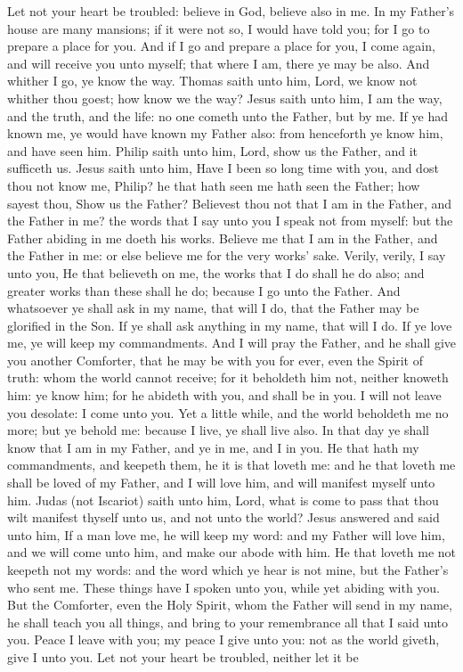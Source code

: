 Let not your heart be troubled: believe in God, believe also in me. In my Father’s house are many mansions; if it were not so, I would have told you; for I go to prepare a place for you. And if I go and prepare a place for you, I come again, and will receive you unto myself; that where I am, there ye may be also. And whither I go, ye know the way. Thomas saith unto him, Lord, we know not whither thou goest; how know we the way? Jesus saith unto him, I am the way, and the truth, and the life: no one cometh unto the Father, but by me. If ye had known me, ye would have known my Father also: from henceforth ye know him, and have seen him. Philip saith unto him, Lord, show us the Father, and it sufficeth us. Jesus saith unto him, Have I been so long time with you, and dost thou not know me, Philip? he that hath seen me hath seen the Father; how sayest thou, Show us the Father? Believest thou not that I am in the Father, and the Father in me? the words that I say unto you I speak not from myself: but the Father abiding in me doeth his works. Believe me that I am in the Father, and the Father in me: or else believe me for the very works’ sake. Verily, verily, I say unto you, He that believeth on me, the works that I do shall he do also; and greater works than these shall he do; because I go unto the Father. And whatsoever ye shall ask in my name, that will I do, that the Father may be glorified in the Son. If ye shall ask anything in my name, that will I do. If ye love me, ye will keep my commandments. And I will pray the Father, and he shall give you another Comforter, that he may be with you for ever, even the Spirit of truth: whom the world cannot receive; for it beholdeth him not, neither knoweth him: ye know him; for he abideth with you, and shall be in you. I will not leave you desolate: I come unto you. Yet a little while, and the world beholdeth me no more; but ye behold me: because I live, ye shall live also. In that day ye shall know that I am in my Father, and ye in me, and I in you. He that hath my commandments, and keepeth them, he it is that loveth me: and he that loveth me shall be loved of my Father, and I will love him, and will manifest myself unto him. Judas (not Iscariot) saith unto him, Lord, what is come to pass that thou wilt manifest thyself unto us, and not unto the world? Jesus answered and said unto him, If a man love me, he will keep my word: and my Father will love him, and we will come unto him, and make our abode with him. He that loveth me not keepeth not my words: and the word which ye hear is not mine, but the Father’s who sent me.  These things have I spoken unto you, while yet abiding with you. But the Comforter, even the Holy Spirit, whom the Father will send in my name, he shall teach you all things, and bring to your remembrance all that I said unto you. Peace I leave with you; my peace I give unto you: not as the world giveth, give I unto you. Let not your heart be troubled, neither let it be 